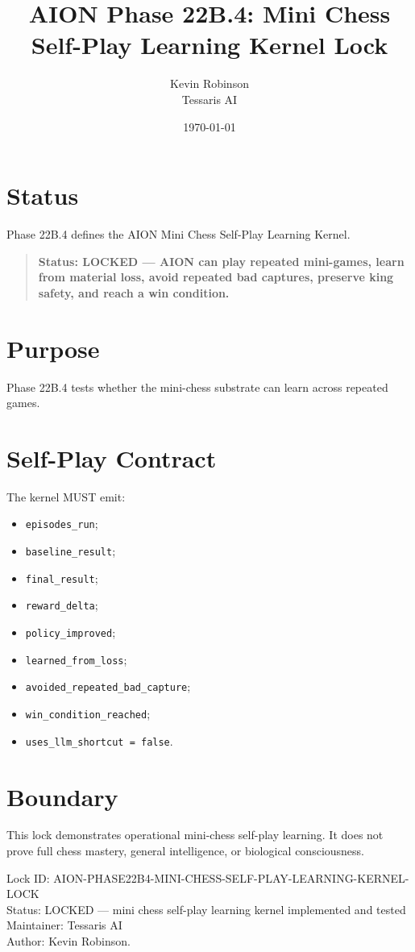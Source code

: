 \documentclass[11pt,a4paper]{article}
\title{\textbf{AION Phase 22B.4: Mini Chess Self-Play Learning Kernel Lock}}
\author{Kevin Robinson\\Tessaris AI}
\date{\today}
\begin{document}
\maketitle

\section{Status}

Phase 22B.4 defines the AION Mini Chess Self-Play Learning Kernel.

\begin{quote}
\textbf{Status: LOCKED --- AION can play repeated mini-games, learn from material loss, avoid repeated bad captures, preserve king safety, and reach a win condition.}
\end{quote}

\section{Purpose}

Phase 22B.4 tests whether the mini-chess substrate can learn across repeated games.

\section{Self-Play Contract}

The kernel MUST emit:

\begin{itemize}
  \item \texttt{episodes\_run};
  \item \texttt{baseline\_result};
  \item \texttt{final\_result};
  \item \texttt{reward\_delta};
  \item \texttt{policy\_improved};
  \item \texttt{learned\_from\_loss};
  \item \texttt{avoided\_repeated\_bad\_capture};
  \item \texttt{win\_condition\_reached};
  \item \texttt{uses\_llm\_shortcut = false}.
\end{itemize}

\section{Boundary}

This lock demonstrates operational mini-chess self-play learning. It does not prove full chess mastery, general intelligence, or biological consciousness.

\bigskip

\noindent
Lock ID: AION-PHASE22B4-MINI-CHESS-SELF-PLAY-LEARNING-KERNEL-LOCK\\
Status: LOCKED --- mini chess self-play learning kernel implemented and tested\\
Maintainer: Tessaris AI\\
Author: Kevin Robinson.
\end{document}
